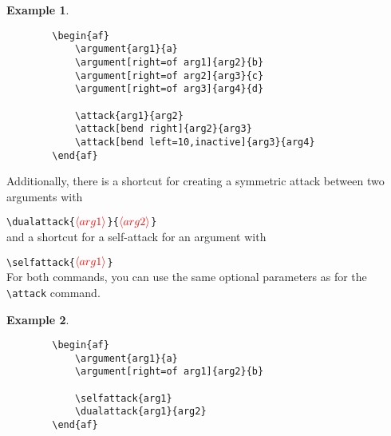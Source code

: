 \documentclass{article}
\newcommand{\opt}[2][red]{\ensuremath{\textcolor{#1}{\langle #2\rangle}}}
\newtheorem{example}{Example}
\begin{document}
    \begin{example}~
    \begin{verbatim}
        \begin{af}
            \argument{arg1}{a}
            \argument[right=of arg1]{arg2}{b}
            \argument[right=of arg2]{arg3}{c}
            \argument[right=of arg3]{arg4}{d}
    
            \attack{arg1}{arg2}
            \attack[bend right]{arg2}{arg3}
            \attack[bend left=10,inactive]{arg3}{arg4}
        \end{af}    
    \end{verbatim}

    \begin{center}
        \begin{af}
    
        \end{af}
    \end{center}
    \end{example}

    Additionally, there is a shortcut for creating a symmetric attack between two arguments with

    \noindent
    \verb|\dualattack{|\opt{arg1}\verb|}{|\opt{arg2}\verb|}|\\

    \noindent
    and a shortcut for a self-attack for an argument with

    \noindent
    \verb|\selfattack{|\opt{arg1}\verb|}|\\

    \noindent
    For both commands, you can use the same optional parameters as for the \verb|\attack| command.

    \begin{example}~
    \begin{verbatim}
        \begin{af}
            \argument{arg1}{a}
            \argument[right=of arg1]{arg2}{b}
    
            \selfattack{arg1}
            \dualattack{arg1}{arg2}
        \end{af}    
    \end{verbatim}

    \begin{center}
        \begin{af}
    
        \end{af}
    \end{center}
    \end{example}
    
\end{document}
